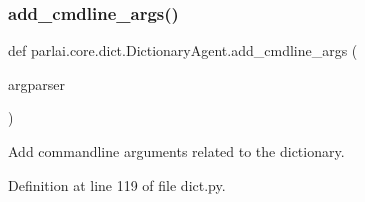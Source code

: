 \subsubsection{\texorpdfstring{add\+\_\+cmdline\+\_\+args()}{add\_cmdline\_args()}}
{\footnotesize\ttfamily def parlai.\+core.\+dict.\+Dictionary\+Agent.\+add\+\_\+cmdline\+\_\+args (\begin{DoxyParamCaption}\item[{}]{argparser }\end{DoxyParamCaption})\hspace{0.3cm}{\ttfamily [static]}}

\begin{DoxyVerb}Add commandline arguments related to the dictionary.
\end{DoxyVerb}
 

Definition at line 119 of file dict.\+py.


